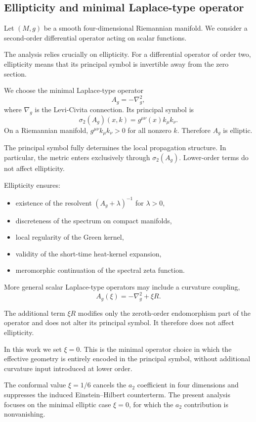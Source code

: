 \subsection{Ellipticity and minimal Laplace-type operator}
  \label{subsec:ellipticity}

  Let $(M,g)$ be a smooth four-dimensional Riemannian manifold.
  We consider a second-order differential operator acting on scalar functions.

  The analysis relies crucially on ellipticity.
  For a differential operator of order two, ellipticity means that its
  principal symbol is invertible away from the zero section.

  We choose the minimal Laplace-type operator
  \begin{equation}
    A_g = -\nabla_g^2 ,
  \end{equation}
  where $\nabla_g$ is the Levi-Civita connection.
  Its principal symbol is
  \begin{equation}
    \sigma_2(A_g)(x,k) = g^{\mu\nu}(x) k_\mu k_\nu .
  \end{equation}
  On a Riemannian manifold, $g^{\mu\nu}k_\mu k_\nu>0$ for all nonzero $k$.
  Therefore $A_g$ is elliptic.

  The principal symbol fully determines the local propagation structure.
  In particular, the metric enters exclusively through $\sigma_2(A_g)$.
  Lower-order terms do not affect ellipticity.

  Ellipticity ensures:

  \begin{itemize}
    \item existence of the resolvent $(A_g+\lambda)^{-1}$ for $\lambda>0$,
    \item discreteness of the spectrum on compact manifolds,
    \item local regularity of the Green kernel,
    \item validity of the short-time heat-kernel expansion,
    \item meromorphic continuation of the spectral zeta function.
  \end{itemize}

  More general scalar Laplace-type operators may include a curvature coupling,
  \begin{equation}
    A_g(\xi) = -\nabla_g^2 + \xi R .
  \end{equation}

  The additional term $\xi R$ modifies only the zeroth-order endomorphism
  part of the operator and does not alter its principal symbol.
  It therefore does not affect ellipticity.

  In this work we set $\xi=0$.
  This is the minimal operator choice in which the effective geometry is
  entirely encoded in the principal symbol, without additional curvature
  input introduced at lower order.

  The conformal value $\xi=1/6$ cancels the $a_2$ coefficient in four
  dimensions and suppresses the induced Einstein--Hilbert counterterm.
  The present analysis focuses on the minimal elliptic case $\xi=0$,
  for which the $a_2$ contribution is nonvanishing.
